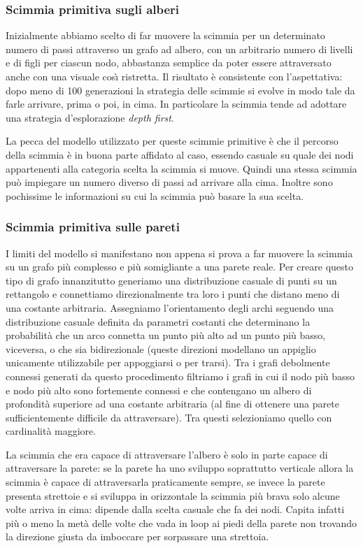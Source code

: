\documentclass{article}
\begin{document}
\subsubsection{Scimmia primitiva sugli alberi}
Inizialmente abbiamo scelto di far muovere la scimmia per un determinato numero di passi attraverso un grafo ad albero, con un arbitrario numero di livelli e di figli per ciascun nodo, abbastanza semplice da poter essere attraversato anche con una visuale cos\`{\i} ristretta.
Il risultato \`{e} consistente con l'aspettativa: dopo meno di 100 generazioni la strategia delle scimmie si evolve in modo tale da farle arrivare, prima o poi, in cima. In particolare la scimmia tende ad adottare una strategia d'esplorazione \textit{depth first}.

La pecca del modello utilizzato per queste scimmie primitive \`{e} che il percorso della scimmia \`{e} in buona parte affidato al caso, essendo casuale su quale dei nodi appartenenti alla categoria scelta la scimmia si muove. Quindi una stessa scimmia pu\`{o} impiegare un numero diverso di passi ad arrivare alla cima. Inoltre sono pochissime le informazioni su cui la scimmia pu\`{o} basare la sua scelta.

\subsubsection{Scimmia primitiva sulle pareti}

I limiti del modello si manifestano non appena si prova a far muovere la scimmia su un grafo pi\`{u} complesso e pi\`{u} somigliante a una parete reale. Per creare questo tipo di grafo innanzitutto generiamo una distribuzione casuale di punti su un rettangolo e connettiamo direzionalmente tra loro i punti che distano meno di una costante arbitraria. Assegniamo l'orientamento degli archi seguendo una distribuzione casuale definita da parametri costanti che determinano la probabilit\`{a} che un arco connetta un punto pi\`{u} alto ad un punto pi\`{u} basso, viceversa, o che sia bidirezionale (queste direzioni modellano un appiglio unicamente utilizzabile per appoggiarsi o per trarsi). Tra i grafi debolmente connessi generati da questo procedimento filtriamo i grafi in cui il nodo pi\`{u} basso e nodo pi\`{u} alto sono fortemente connessi e che contengano un albero di profondit\`{a} superiore ad una costante arbitraria (al fine di ottenere una parete sufficientemente difficile da attraversare). Tra questi selezioniamo quello con cardinalit\`{a} maggiore.

La scimmia che era capace di attraversare l'albero \`{e} solo in parte capace di attraversare la parete: se la parete ha uno sviluppo soprattutto verticale allora la scimmia \`{e} capace di attraversarla praticamente sempre, se invece la parete presenta strettoie e si sviluppa in orizzontale la scimmia pi\`{u} brava solo alcune volte arriva in cima: dipende dalla scelta casuale che fa dei nodi. Capita infatti pi\`{u} o meno la met\`{a} delle volte che vada in loop ai piedi della parete non trovando la direzione giusta da imboccare per sorpassare una strettoia.
\end{document}
